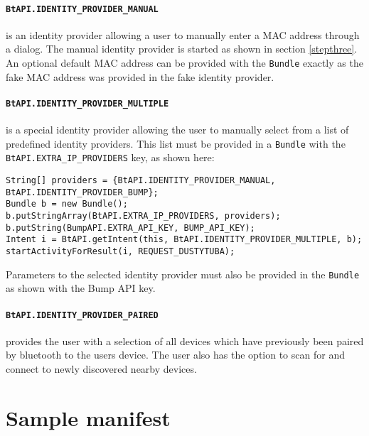 \documentclass[a4paper,11pt]{article}
\begin{document}
\paragraph{{\tt BtAPI.IDENTITY\_PROVIDER\_MANUAL}}
is an identity provider allowing a user to manually enter a MAC address through a dialog. The manual identity provider is started as shown in section \ref{stepthree}. An optional default MAC address can be provided with the \verb+Bundle+ exactly as the fake MAC address was provided in the fake identity provider.

\paragraph{{\tt BtAPI.IDENTITY\_PROVIDER\_MULTIPLE}}
is a special identity provider allowing the user to manually select from a list of predefined identity providers. This list must be provided in a \verb+Bundle+ with the \verb+BtAPI.EXTRA_IP_PROVIDERS+ key, as shown here:

\footnotesize
\begin{verbatim}
String[] providers = {BtAPI.IDENTITY_PROVIDER_MANUAL, BtAPI.IDENTITY_PROVIDER_BUMP};
Bundle b = new Bundle();
b.putStringArray(BtAPI.EXTRA_IP_PROVIDERS, providers);
b.putString(BumpAPI.EXTRA_API_KEY, BUMP_API_KEY);
Intent i = BtAPI.getIntent(this, BtAPI.IDENTITY_PROVIDER_MULTIPLE, b);
startActivityForResult(i, REQUEST_DUSTYTUBA);
\end{verbatim}
\normalsize

Parameters to the selected identity provider must also be provided in the \verb+Bundle+ as shown with the Bump\texttrademark{} API key.

\paragraph{{\tt BtAPI.IDENTITY\_PROVIDER\_PAIRED}}
provides the user with a selection of all devices which have previously been paired by bluetooth to the users device. The user also has the option to scan for and connect to newly discovered nearby devices.


\clearpage
\appendix

\section{Sample manifest}
\label{sample-manifest}
\end{document}
